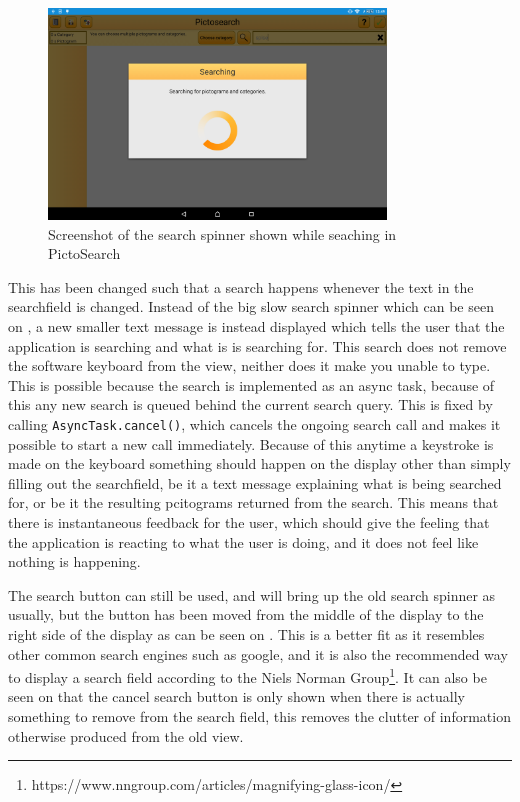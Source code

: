 \begin{figure}[h]
    \centering
    \includegraphics[width=0.8\textwidth]{figures/img/screenshots/old_dialog.png}
    \caption{Screenshot of the search spinner shown while seaching in PictoSearch}\label{fig:screenshot_searchspinner}
\end{figure}
This has been changed such that a search happens whenever the text in the searchfield is changed.
Instead of the big slow search spinner which can be seen on , a new smaller text message is instead displayed which tells the user that the application is searching and what is is searching for. 
This search does not remove the software keyboard from the view, neither does it make you unable to type.
This is possible because the search is implemented as an async task, because of this any new search is queued behind the current search query.
This is fixed by calling \texttt{AsyncTask.cancel()}, which cancels the ongoing search call and makes it possible to start a new call immediately.
Because of this anytime a keystroke is made on the keyboard something should happen on the display other than simply filling out the searchfield, be it a text message explaining what is being searched for, or be it the resulting pcitograms returned from the search.
This means that there is instantaneous feedback for the user, which should give the feeling that the application is reacting to what the user is doing, and it does not feel like nothing is happening.

The search button can still be used, and will bring up the old search spinner as usually, but the button has been moved from the middle of the display to the right side of the display as can be seen on .
This is a better fit as it resembles other common search engines such as google, and it is also the recommended way to display a search field according to the Niels Norman Group\footnote{https://www.nngroup.com/articles/magnifying-glass-icon/}.
It can also be seen on  that the cancel search button is only shown when there is actually something to remove from the search field, this removes the clutter of information otherwise produced from the old view.

